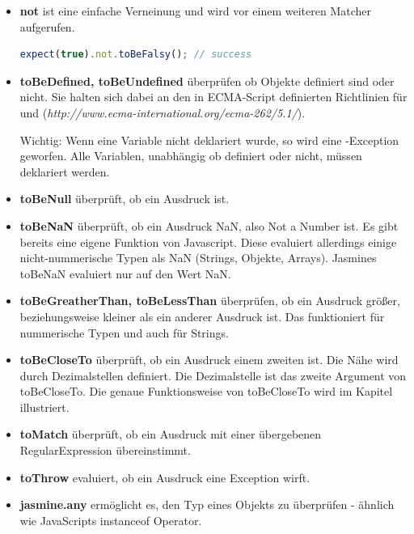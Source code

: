 \begin{itemize}
  \item \textbf{not} ist eine einfache Verneinung und wird vor einem weiteren Matcher aufgerufen.
  \begin{lstlisting}[language=JavaScript]
    expect(true).not.toBeFalsy(); // success
  \end{lstlisting}

  \item \textbf{toBeDefined, toBeUndefined} überprüfen ob Objekte definiert sind oder nicht. Sie halten sich dabei an den in ECMA-Script definierten Richtlinien für  und  (\textit{http://www.ecma-international.org/ecma-262/5.1/}).

  Wichtig: Wenn eine Variable nicht deklariert wurde, so wird eine -Exception geworfen. Alle Variablen, unabhängig ob definiert oder nicht, müssen deklariert werden.

  \item \textbf{toBeNull} überprüft, ob ein Ausdruck  ist.

  \item \textbf{toBeNaN} überprüft, ob ein Ausdruck NaN, also Not a Number ist.
  Es gibt bereits eine eigene  Funktion von Javascript. Diese evaluiert allerdings einige nicht-nummerische Typen als NaN (Strings, Objekte, Arrays). Jasmines toBeNaN evaluiert nur auf den Wert NaN.

  \item \textbf{toBeGreatherThan, toBeLessThan} überprüfen, ob ein Ausdruck größer, beziehungsweise kleiner als ein anderer Ausdruck ist. Das funktioniert für nummerische Typen und auch für Strings.

  \item \textbf{toBeCloseTo} überprüft, ob ein Ausdruck  einem zweiten ist. Die Nähe wird durch Dezimalstellen definiert. Die Dezimalstelle ist das zweite Argument von toBeCloseTo. Die genaue Funktionsweise von toBeCloseTo wird im Kapitel  illustriert.

  \item \textbf{toMatch} überprüft, ob ein Ausdruck mit einer übergebenen RegularExpression übereinstimmt.

  \item \textbf{toThrow} evaluiert, ob ein Ausdruck eine Exception wirft.

  \item \textbf{jasmine.any} ermöglicht es, den Typ eines Objekts zu überprüfen - ähnlich wie JavaScripts instanceof Operator.


\end{itemize}

